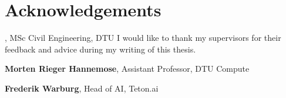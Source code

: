 \section*{Acknowledgements}
\textbf{\thesisauthor}, MSc Civil Engineering, DTU \newline
I would like to thank my supervisors for their feedback and advice during my writing of this thesis.

\textbf{Morten Rieger Hannemose}, Assistant Professor, DTU Compute

\textbf{Frederik Warburg}, Head of AI, Teton.ai
